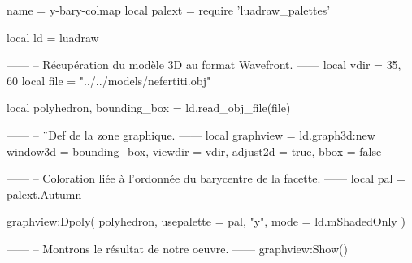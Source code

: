 \documentclass[border = 3pt]{standalone}
\begin{document}
\begin{luadraw*}{name = y-bary-colmap}
local palext = require 'luadraw_palettes'

local ld = luadraw

------
-- Récupération du modèle 3D au format Wavefront.
------
local vdir = {35, 60}
local file = "../../models/nefertiti.obj"

local polyhedron, bounding_box = ld.read_obj_file(file)

------
-- ¨Def de la zone graphique.
------
local graphview = ld.graph3d:new{
  window3d = bounding_box,
  viewdir  = vdir,
  adjust2d = true,
  bbox     = false
}

------
-- Coloration liée à l'ordonnée du barycentre de la facette.
------
local pal = palext.Autumn

graphview:Dpoly(
  polyhedron,
  {
    usepalette = {pal, "y"},
    mode       = ld.mShadedOnly
  }
)

------
-- Montrons le résultat de notre oeuvre.
------
graphview:Show()
\end{luadraw*}
\end{document}
